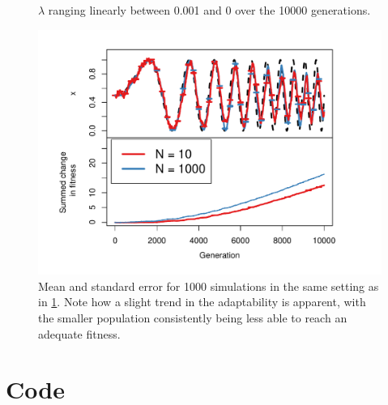 \documentclass[10pt]{article}\usepackage[]{graphicx}\usepackage[]{color}
\makeatletter
\def\maxwidth{ %
  \ifdim\Gin@nat@width>\linewidth
    \linewidth
  \else
    \Gin@nat@width
  \fi
}
\theoremstyle{plain}
\makeatother
\begin{document}
\begin{multicols*}{2}
\begin{Schunk}
\begin{figure}[H]
{}

\caption[$\lambda$ ranging linearly between 0.001 and 0 over the 10000 generations]{$\lambda$ ranging linearly between 0.001 and 0 over the 10000 generations.}\label{fig:fisherd}
\end{figure}
\end{Schunk}

\begin{Schunk}
\begin{figure}[H]

{\centering \includegraphics[width=\maxwidth]{figure/twocolumn-fisherd_ext-1} 

}

\caption{Mean and standard error for 1000 simulations in the same setting as in \cref{fig:fisherd}. Note how a slight trend in the adaptability is apparent, with the smaller population consistently being less able to reach an adequate fitness.}\label{fig:fisherd_ext}
\end{figure}
\end{Schunk}


\end{multicols*}
\newpage
\onecolumn
  \appendix
\section{Code}
   
   
   
   
   
   
   
\end{document}
